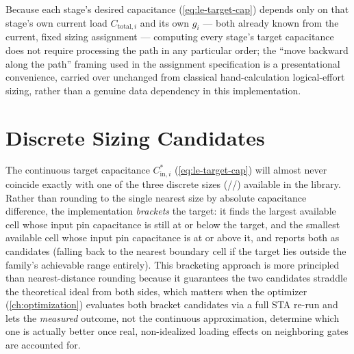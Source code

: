 Because each stage's desired capacitance (\cref{eq:le-target-cap}) depends
only on that stage's own current load $C_{\mathrm{total},i}$ and its own
$g_i$ --- both already known from the current, fixed sizing assignment ---
computing every stage's target capacitance does not require processing the
path in any particular order; the ``move backward along the path'' framing
used in the assignment specification is a presentational convenience,
carried over unchanged from classical hand-calculation logical-effort
sizing, rather than a genuine data dependency in this implementation.

\section{Discrete Sizing Candidates}
\label{sec:le-candidates}

The continuous target capacitance $C^{*}_{\mathrm{in},i}$
(\cref{eq:le-target-cap}) will almost never coincide exactly with one of the
three discrete sizes (//) available in the
library. Rather than rounding to the single nearest size by absolute
capacitance difference, the implementation \emph{brackets} the target: it
finds the largest available cell whose input pin capacitance is still at or
below the target, and the smallest available cell whose input pin
capacitance is at or above it, and reports both as candidates (falling back
to the nearest boundary cell if the target lies outside the family's
achievable range entirely). This bracketing approach is more principled
than nearest-distance rounding because it guarantees the two candidates
straddle the theoretical ideal from both sides, which matters when the
optimizer (\cref{ch:optimization}) evaluates both bracket candidates via a
full STA re-run and lets the \emph{measured} outcome, not the continuous
approximation, determine which one is actually better once real,
non-idealized loading effects on neighboring gates are accounted for.

